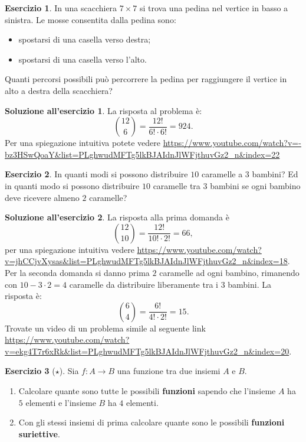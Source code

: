\documentclass[12pt,a4paper]{article}
\theoremstyle{definition}
\newtheorem{sol}{Soluzione all'esercizio}
\newtheorem{exe}{Esercizio}
\begin{document}
\begin{exe}
	In una scacchiera $ 7 \times 7 $ si trova una pedina nel vertice in basso a sinistra. Le mosse consentita dalla pedina sono:
	\begin{itemize}
		\item spostarsi di una casella verso destra;
		\item  spostarsi di una casella verso l'alto.
	\end{itemize}
	Quanti percorsi possibili può percorrere la pedina per raggiungere il vertice in alto a destra della scacchiera?
\end{exe}

\begin{sol}
	La risposta al problema è:
	\[ \binom{12}{6}  = \frac{12!}{6!\cdot6!} = 924. \] Per una spiegazione intuitiva potete vedere \url{https://www.youtube.com/watch?v=-bz3HSwQoaY&list=PLghwudMFTg5lkBJAIdnJlWFjthuvGz2_n&index=22}
\end{sol}

\begin{exe}
	In quanti modi si possono distribuire $ 10 $ caramelle a $ 3 $ bambini? Ed in quanti modo si possono distribuire $ 10 $ caramelle tra $ 3 $ bambini se ogni bambino deve ricevere almeno $ 2 $ caramelle?
\end{exe}

\begin{sol}
	La risposta alla prima domanda è
	\[ \binom{12}{10} = \frac{12!}{10!\cdot2!} = 66, \]
	per una spiegazione intuitiva vedere \url{https://www.youtube.com/watch?v=jhCCjvXysas&list=PLghwudMFTg5lkBJAIdnJlWFjthuvGz2_n&index=18}.\\ Per la seconda domanda si danno prima $2$ caramelle ad ogni bambino, rimanendo con $10 - 3 \cdot 2 = 4$ caramelle da distribuire liberamente tra i $3$ bambini. La risposta è:
	\[ \binom{6}{4} = \frac{6!}{4!\cdot2!} = 15. \]
	Trovate un video di un problema simile al seguente link\\ \url{https://www.youtube.com/watch?v=ekg4T7r6xRk&list=PLghwudMFTg5lkBJAIdnJlWFjthuvGz2_n&index=20}.
\end{sol}

\begin{exe}[$\star$]  Sia $ f:A \to B $ una funzione tra due insiemi $ A $ e $ B $.
	\begin{enumerate}
		\item Calcolare quante sono tutte le possibili \textbf{funzioni} sapendo che l'insieme $ A $ ha $ 5 $ elementi e l'insieme $ B $ ha $ 4 $ elementi.
		\item  Con gli stessi insiemi di prima calcolare quante sono le possibili \textbf{funzioni suriettive}.
	\end{enumerate}
\end{exe}
\end{document}
